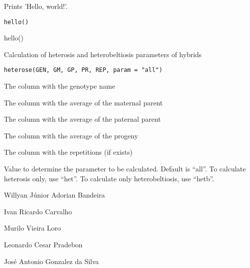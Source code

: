 \documentclass[a4paper]{book}
\begin{document}
%
\begin{Description}
Prints 'Hello, world!'.
\end{Description}
%
\begin{Usage}
\begin{verbatim}
hello()
\end{verbatim}
\end{Usage}
%
\begin{Examples}
\begin{ExampleCode}
hello()
\end{ExampleCode}
\end{Examples}
%
\begin{Description}
Calculation of heterosis and heterobeltiosis parameters of hybrids
\end{Description}
%
\begin{Usage}
\begin{verbatim}
heterose(GEN, GM, GP, PR, REP, param = "all")
\end{verbatim}
\end{Usage}
%
\begin{Arguments}
\begin{ldescription}
\item[\code{GEN}] The column with the genotype name

\item[\code{GM}] The column with the average of the maternal parent

\item[\code{GP}] The column with the average of the paternal parent

\item[\code{PR}] The column with the average of the progeny

\item[\code{REP}] The column with the repetitions (if exists)

\item[\code{param}] Value to determine the parameter to be calculated. Default is “all”.
To calculate heterosis only, use “het”. To calculate only heterobeltiosis,
use “hetb”.
\end{ldescription}
\end{Arguments}
%
\begin{Author}
Willyan Júnior Adorian Bandeira

Ivan Ricardo Carvalho

Murilo Vieira Loro

Leonardo Cesar Pradebon

José Antonio Gonzalez da Silva
\end{Author}
\end{document}
